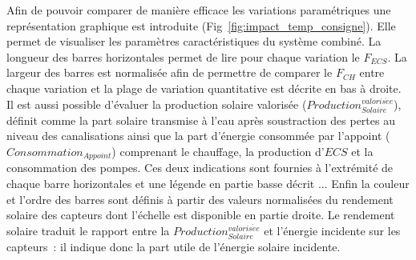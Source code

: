 Afin de pouvoir comparer de manière efficace les variations paramétriques une
représentation graphique est introduite (Fig~\ref{fig:impact_temp_consigne}). Elle permet
de visualiser les paramètres caractéristiques du système combiné. La longueur des barres
horizontales permet de lire pour chaque variation le $F_{ECS}$. La largeur des barres est
normalisée afin de permettre de comparer le $F_{CH}$ entre chaque variation et la plage de
variation quantitative est décrite en bas à droite. Il est aussi possible d’évaluer la
production solaire valorisée ($Production_{Solaire}^{valoris\acute ee}$), définit comme la part
solaire transmise à l’eau après soustraction des pertes au niveau des canalisations ainsi
que la part d’énergie consommée par l’appoint ($Consommation_{Appoint}$) comprenant le
chauffage, la production d’$ECS$ et la consommation des pompes. Ces deux indications sont
fournies à l’extrémité de chaque barre horizontales et une légende en partie basse décrit
... Enfin la couleur et l’ordre des barres sont définis à partir des valeurs normalisées
du rendement solaire des capteurs dont l’échelle est disponible en partie droite. Le
rendement solaire traduit le rapport entre la $Production_{Solaire}^{valoris\acute ee}$ et
l’énergie incidente sur les capteurs~: il indique donc la part utile de l’énergie solaire
incidente.

